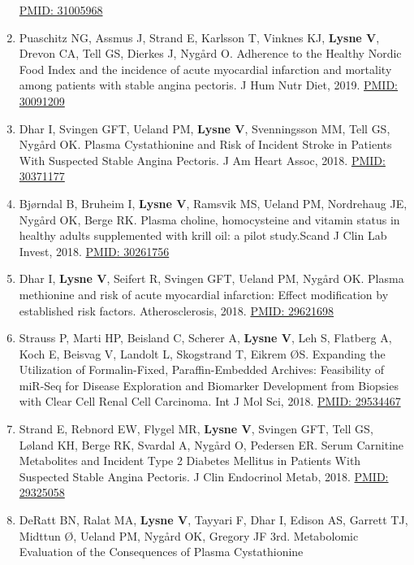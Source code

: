\documentclass[11pt, a4paper]{awesome-cv}
\begin{document}
\begin{enumerate}
  \href{https://www.ncbi.nlm.nih.gov/pubmed/31005968}{PMID: 31005968}
\item
  Puaschitz NG, Assmus J, Strand E, Karlsson T, Vinknes KJ,
  \textbf{Lysne V}, Drevon CA, Tell GS, Dierkes J, Nygård O. Adherence
  to the Healthy Nordic Food Index and the incidence of acute myocardial
  infarction and mortality among patients with stable angina pectoris. J
  Hum Nutr Diet, 2019.
  \href{https://www.ncbi.nlm.nih.gov/pubmed/30091209}{PMID: 30091209}
\item
  Dhar I, Svingen GFT, Ueland PM, \textbf{Lysne V}, Svenningsson MM,
  Tell GS, Nygård OK. Plasma Cystathionine and Risk of Incident Stroke
  in Patients With Suspected Stable Angina Pectoris. J Am Heart Assoc,
  2018. \href{https://www.ncbi.nlm.nih.gov/pubmed/30371177}{PMID:
  30371177}
\item
  Bjørndal B, Bruheim I, \textbf{Lysne V}, Ramsvik MS, Ueland PM,
  Nordrehaug JE, Nygård OK, Berge RK. Plasma choline, homocysteine and
  vitamin status in healthy adults supplemented with krill oil: a pilot
  study.Scand J Clin Lab Invest, 2018.
  \href{https://www.ncbi.nlm.nih.gov/pubmed/30261756}{PMID: 30261756}
\item
  Dhar I, \textbf{Lysne V}, Seifert R, Svingen GFT, Ueland PM, Nygård
  OK. Plasma methionine and risk of acute myocardial infarction: Effect
  modification by established risk factors. Atherosclerosis, 2018.
  \href{https://www.ncbi.nlm.nih.gov/pubmed/29621698}{PMID: 29621698}
\item
  Strauss P, Marti HP, Beisland C, Scherer A, \textbf{Lysne V}, Leh S,
  Flatberg A, Koch E, Beisvag V, Landolt L, Skogstrand T, Eikrem ØS.
  Expanding the Utilization of Formalin-Fixed, Paraffin-Embedded
  Archives: Feasibility of miR-Seq for Disease Exploration and Biomarker
  Development from Biopsies with Clear Cell Renal Cell Carcinoma. Int J
  Mol Sci, 2018.
  \href{https://www.ncbi.nlm.nih.gov/pubmed/29534467}{PMID: 29534467}
\item
  Strand E, Rebnord EW, Flygel MR, \textbf{Lysne V}, Svingen GFT, Tell
  GS, Løland KH, Berge RK, Svardal A, Nygård O, Pedersen ER. Serum
  Carnitine Metabolites and Incident Type 2 Diabetes Mellitus in
  Patients With Suspected Stable Angina Pectoris. J Clin Endocrinol
  Metab, 2018. \href{https://www.ncbi.nlm.nih.gov/pubmed/29325058}{PMID:
  29325058}
\item
  DeRatt BN, Ralat MA, \textbf{Lysne V}, Tayyari F, Dhar I, Edison AS,
  Garrett TJ, Midttun Ø, Ueland PM, Nygård OK, Gregory JF 3rd.
  Metabolomic Evaluation of the Consequences of Plasma Cystathionine

\end{enumerate}
\end{document}
